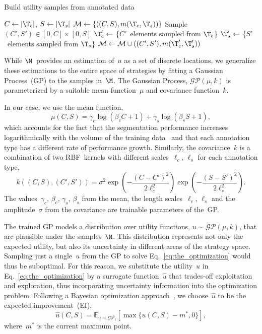 \begin{algorithm}[t!] 
\caption{Build utility samples from annotated data}
\label{alg:build_gp_samples}
\begin{algorithmic}[1]
    \State $C \leftarrow |\T_c|$, $S \leftarrow |\T_s|$
    \State $\mathcal{M} \leftarrow \{((C, S), m(\T_c,\T_s))\}$ 
    \State Sample $(C', S')\in[0, C]\times[0, S]$
    \State $\T'_c \leftarrow$ \{$C'$~elements sampled from $\T_c$\}
    \State $\T'_s \leftarrow$ \{$S'$~elements sampled from $\T_s$\}
    \State $\mathcal{M} \leftarrow \mathcal{M} \cup ((C', S'), m(\T'_c, \T'_s))$ 
    \EndRepeat
    \EndFunction
\end{algorithmic}
\end{algorithm}

While $\M$~provides an estimation of~$u$ as a set of discrete locations, we generalize these estimations to the entire space of strategies by fitting a Gaussian Process~(GP) to the samples in~$\M$. The Gaussian Process, $\mathcal{GP}(\mu, k)$ is parameterized by a suitable mean function~$\mu$ and covariance function~$k$. 

In our case, we use the mean function,
\begin{equation}
    \mu(C, S) = \gamma_c\log(\beta_cC+1) + \gamma_s\log(\beta_sS+1),
    \label{eq:gp_mean}
\end{equation}
which accounts for the fact that the segmentation performance increases logarithmically with the volume of the training data~ and that each annotation type has a different rate of performance growth. Similarly, the covariance~$k$ is a combination of two RBF~kernels with different scales~$\ell_c$, $\ell_s$ for each annotation type,
\begin{equation}
    k\left((C, S), (C', S')\right) = \sigma^2\exp\left(-\frac{(C-C')^2}{2\ell_c^2}\right) \exp\left(-\frac{(S-S')^2}{2\ell_s^2}\right).
\end{equation}
The values~$\gamma_c$, $\beta_c$, $\gamma_s$, $\beta_s$ from the mean, the length scales~$\ell_c$, $\ell_s$ and the amplitude~$\sigma$ from the covariance are trainable parameters of the~GP.


The trained GP models a distribution over utility functions, $u \sim\mathcal{GP}(\mu, k)$, that are plausible under the samples~$\M$. This distribution represents not only the expected utility, but also its uncertainty in different areas of the strategy space. Sampling just a single~$u$ from the GP to solve Eq.~\eqref{eq:the_optimization} would thus be suboptimal. For this reason, we substitute the utility~$u$ in Eq.~\eqref{eq:the_optimization} by a surrogate function~$\hat{u}$ that trades-off exploitation and exploration, thus incorporating uncertainty information into the optimization problem. Following a Bayesian optimization approach~, we choose~$\hat{u}$ to be the expected improvement~(EI),
\begin{equation}
    \hat{u}(C, S) = \mathbb{E}_{u\sim\mathcal{GP}_t}[\max\{u(C, S) - m^*, 0\}],
    \label{eq:EI}
\end{equation}
where~$m^*$ is the current maximum point.

